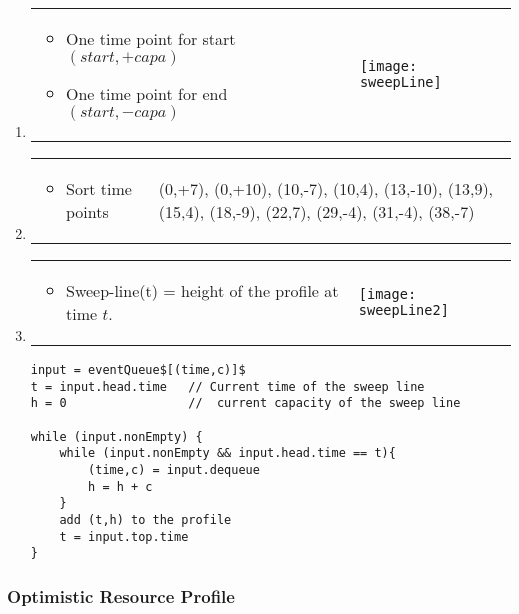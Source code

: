 \begin{enumerate}
    \item \begin{tabular}{m{5cm}m{10cm}}
            \begin{itemize}
                \item One time point for start $(start, +capa)$
                \item One time point for end $(start, -capa)$ 
            \end{itemize}&
                    \texttt{[image: sweepLine]}
                \end{tabular}


            \item \begin{tabular}{m{5cm}m{8cm}}
                    \begin{itemize}
                        \item Sort time points
                    \end{itemize}
                    &

                    (0,+7), (0,+10), (10,-7), (10,4), (13,-10), (13,9), (15,4), (18,-9), (22,7), (29,-4), (31,-4), (38,-7)
                \end{tabular}

            \item \begin{tabular}{m{5cm}m{10cm}}
                    \begin{itemize}
                        \item Sweep-line(t) = height of the profile at time $t$.
                    \end{itemize}
                    &
                    \texttt{[image: sweepLine2]}
                \end{tabular}

                \begin{lstlisting}[mathescape]
input = eventQueue$[(time,c)]$
t = input.head.time   // Current time of the sweep line
h = 0                 //  current capacity of the sweep line 

while (input.nonEmpty) {
    while (input.nonEmpty && input.head.time == t){
        (time,c) = input.dequeue
        h = h + c
    }
    add (t,h) to the profile
    t = input.top.time
}
            \end{lstlisting}
    \end{enumerate}


\subsubsection{Optimistic Resource Profile}

